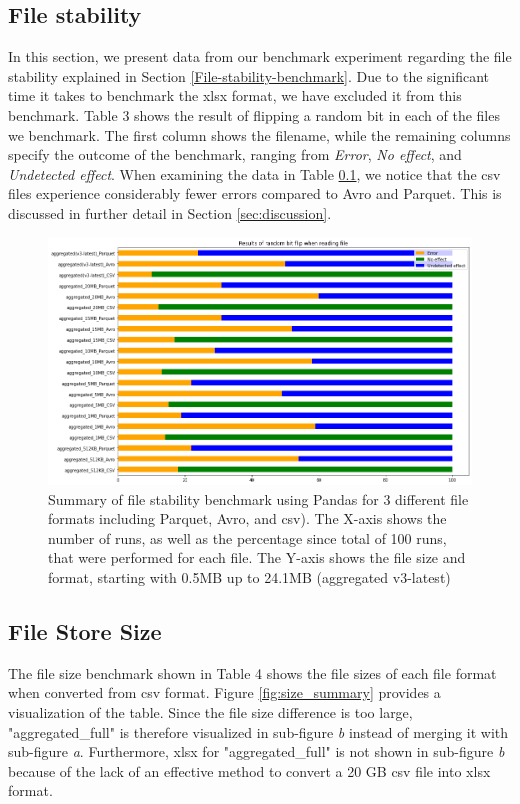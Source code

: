 \subsection{File stability}
\label{sect:file-stability-results}
 In this section, we present data from our benchmark experiment regarding the file stability explained in Section \ref{File-stability-benchmark}. Due to the significant time it takes to benchmark the xlsx format, we have excluded it from this benchmark. Table 3 shows the result of flipping a random bit in each of the files we benchmark. The first column shows the filename, while the remaining columns specify the outcome of the benchmark, ranging from \textit{Error}, \textit{No effect}, and \textit{Undetected effect}. When examining the data in Table \ref{sect:file-stability-results}, we notice that the csv files experience considerably fewer errors compared to Avro and Parquet. This is discussed in further detail in Section \ref{sec:discussion}.

\begin{figure}[h]
\centering
\includegraphics[scale=0.5]{img/stability.png}
\caption{Summary of file stability benchmark using Pandas for 3 different file formats including Parquet, Avro, and csv). The X-axis shows the number of runs, as well as the percentage since total of 100 runs, that were performed for each file. The Y-axis shows the file size and format, starting with 0.5MB up to 24.1MB (aggregated v3-latest)}
\label{fig:x cubed graph}
\end{figure}

\subsection{File Store Size}
The file size benchmark shown in Table 4 shows the file sizes of each file format when converted from csv format. Figure \ref{fig:size_summary} provides a visualization of the table. Since the file size difference is too large, "aggregated\_full" is therefore visualized in sub-figure \textit{b} instead of merging it with sub-figure \textit{a}. Furthermore, xlsx for "aggregated\_full" is not shown in sub-figure \textit{b} because of the lack of an effective method to convert a 20 GB csv file into xlsx format. 


